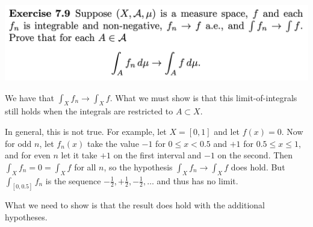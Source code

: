 \begin{mdframed}
\includegraphics[width=400pt]{img/analysis--berkeley-202a-hw08-3203.png}
\end{mdframed}

\begin{remark*}
  We have that $\int_X f_n \to \int_X f$. What we must show is that this limit-of-integrals still holds when
  the integrals are restricted to $A \subset X$.

  In general, this is not true. For example, let $X = [0, 1]$ and let $f(x) = 0$. Now for odd $n$, let $f_n(x)$
  take the value $-1$ for $0 \leq x < 0.5$ and $+1$ for $0.5 \leq x \leq 1$, and for even $n$ let it take $+1$
  on the first interval and $-1$ on the second. Then $\int_X f_n = 0 = \int_X f$ for all $n$, so the
  hypothesis $\int_X f_n \to \int_X f$ does hold. But $\int_{[0, 0.5]} f_n$ is the
  sequence $-\frac{1}{2}, +\frac{1}{2}, -\frac{1}{2}, \ldots$ and thus has no limit.

  What we need to show is that the result does hold with the additional hypotheses.
\end{remark*}

